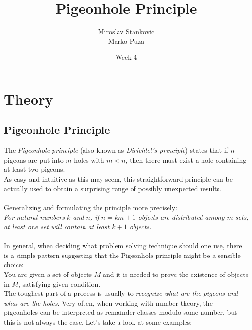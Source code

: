 \documentclass[12pt,a4paper]{article}
\title{\textbf{Pigeonhole Principle}}
\date{Week 4}
\author{Miroslav Stankovic\\ Marko Puza}
\newtheorem{theorem}{Example}
\begin{document}
\maketitle

\section{Theory}
\subsection*{Pigeonhole Principle}
The \emph{Pigeonhole principle} (also known as \emph{Dirichlet's principle}) states that if $n$ pigeons are put into $m$ holes with $m < n$, then there must exist a hole containing at least two pigeons. \\
As easy and intuitive as this may seem, this straightforward principle can be actually used to obtain a surprising range of possibly unexpected results.
\\\\
Generalizing and formulating the principle more precisely: \\
\emph{For natural numbers $k$ and $n$, if $n = km + 1$ objects are distributed among $m$ sets, at least one set will contain at least $k + 1$ objects.}
\\\\
In general, when deciding what problem solving technique should one use, there is a simple pattern suggesting that the Pigeonhole principle might be a sensible choice:\\
You are given a set of objects $M$ and it is needed to prove the existence of objects in $M$, satisfying given condition. \\
The toughest part of a process is usually to \emph{recognize what are the pigeons and what are the holes}. Very often, when working with number theory, the pigeonholes can be interpreted as remainder classes modulo some number, but this is not always the case. Let's take a look at some examples:

\begin{theorem}
There exist a pair of people from Edinburgh that have the same number of hairs on their heads.
\end{theorem}
\begin{proof}
A person's head has no more than $300 000$ hairs, the popoulation of Edinburgh is over $450 000$. Therefore, by pigeonhole principle, there must exist such pair.
\end{proof}
\end{document}
